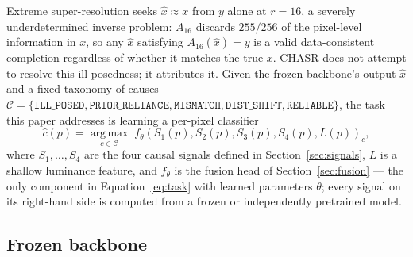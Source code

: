 \documentclass[review]{elsarticle}
\begin{document}
Extreme super-resolution seeks $\hat{x} \approx x$ from $y$ alone at $r = 16$, a severely underdetermined inverse problem: $A_{16}$ discards $255/256$ of the pixel-level information in $x$, so any $\hat{x}$ satisfying $A_{16}(\hat{x}) = y$ is a valid data-consistent completion regardless of whether it matches the true $x$. CHASR does not attempt to resolve this ill-posedness; it attributes it. Given the frozen backbone's output $\hat{x}$ and a fixed taxonomy of causes $\mathcal{C} = \{\texttt{ILL\_POSED}, \texttt{PRIOR\_RELIANCE}, \texttt{MISMATCH}, \texttt{DIST\_SHIFT}, \texttt{RELIABLE}\}$, the task this paper addresses is learning a per-pixel classifier
\begin{equation}
\hat{c}(p) = \operatorname*{arg\,max}_{c \in \mathcal{C}} \; f_\theta\!\left(S_1(p), S_2(p), S_3(p), S_4(p), L(p)\right)_c,
\label{eq:task}
\end{equation}
where $S_1, \dots, S_4$ are the four causal signals defined in Section~\ref{sec:signals}, $L$ is a shallow luminance feature, and $f_\theta$ is the fusion head of Section~\ref{sec:fusion} — the only component in Equation~\ref{eq:task} with learned parameters $\theta$; every signal on its right-hand side is computed from a frozen or independently pretrained model.

\subsection{Frozen backbone}
\label{sec:backbone}
\end{document}
